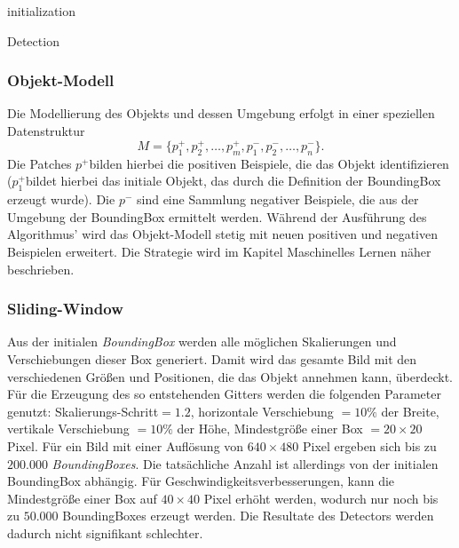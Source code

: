 	\begin{algorithm}
	\vspace{0.2cm}

	initialization\;
	\caption{Detection}
	\label{alg:detection}
	\vspace{0.2cm}
	\end{algorithm}

	\subsubsection{Objekt-Modell}
	Die Modellierung des Objekts und dessen Umgebung erfolgt in einer speziellen Datenstruktur
	\begin{equation}
	M=\{p_{1}^{+},p_{2}^{+},\dots,p_{m}^{+},p_{1}^{-},p_{2}^{-},\dots,p_{n}^{-}\}.
	\end{equation}
	Die Patches $p^{+}$bilden hierbei die positiven Beispiele, die das Objekt identifizieren ($p_{1}^{+}$bildet hierbei das initiale Objekt, das durch die Definition der BoundingBox erzeugt wurde). Die $p^{-}$ sind eine Sammlung negativer Beispiele, die aus der Umgebung der BoundingBox ermittelt werden. Während der Ausführung des Algorithmus' wird das Objekt-Modell stetig mit neuen positiven und negativen Beispielen erweitert. Die Strategie wird im Kapitel Maschinelles Lernen näher beschrieben.

	\subsubsection{Sliding-Window}
	Aus der initialen \textit{BoundingBox} werden alle möglichen Skalierungen und Verschiebungen dieser Box generiert. Damit wird das gesamte Bild mit den verschiedenen Größen und Positionen, die das Objekt annehmen kann, überdeckt. Für die Erzeugung des so entstehenden Gitters werden die folgenden Parameter genutzt: Skalierungs-Schritt$=1.2$, horizontale Verschiebung $=10\%$ der Breite, vertikale Verschiebung $=10\%$ der Höhe, Mindestgröße einer Box $=20\times20$ Pixel. Für ein Bild mit einer Auflösung von $640\times480$ Pixel ergeben sich bis zu $200.000$ \textit{BoundingBoxes}. Die tatsächliche Anzahl ist allerdings von der initialen BoundingBox abhängig. Für Geschwindigkeitsverbesserungen, kann die Mindestgröße einer Box auf $40\times40$ Pixel erhöht werden, wodurch nur noch bis zu $50.000$ BoundingBoxes erzeugt werden. Die Resultate des Detectors werden dadurch nicht signifikant schlechter.

